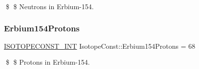\$ \$ Neutrons in Erbium-\/154. \mbox{\label{group___isotope_const-_erbium-_er154_ga70295fe01df82a1c60b5009981f01b41}} 
\subsubsection{\texorpdfstring{Erbium154\+Protons}{Erbium154Protons}}
{\footnotesize\ttfamily \mbox{\hyperlink{group___isotope_const-_macros_ga5f18360b3e99483a35c32d789e62621c}{I\+S\+O\+T\+O\+P\+E\+C\+O\+N\+S\+T\+\_\+\+I\+NT}} Isotope\+Const\+::\+Erbium154\+Protons = 68}

\$ \$ Protons in Erbium-\/154. 